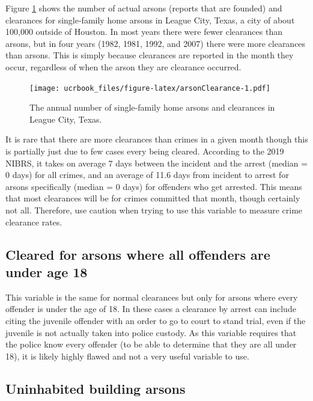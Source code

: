 \documentclass[
  12pt,
  openany]{book}
\begin{document}
Figure \ref{fig:arsonClearance} shows the number of actual arsons (reports that are founded) and clearances for single-family home arsons in League City, Texas, a city of about 100,000 outside of Houston. In most years there were fewer clearances than arsons, but in four years (1982, 1981, 1992, and 2007) there were more clearances than arsons. This is simply because clearances are reported in the month they occur, regardless of when the arson they are clearance occurred.

\begin{figure}
\centering
\texttt{[image: ucrbook\_files/figure-latex/arsonClearance-1.pdf]}
\caption{\label{fig:arsonClearance}The annual number of single-family home arsons and clearances in League City, Texas.}
\end{figure}

It is rare that there are more clearances than crimes in a given month though this is partially just due to few cases every being cleared. According to the 2019 NIBRS, it takes on average 7 days between the incident and the arrest (median = 0 days) for all crimes, and an average of 11.6 days from incident to arrest for arsons specifically (median = 0 days) for offenders who get arrested. This means that most clearances will be for crimes committed that month, though certainly not all. Therefore, use caution when trying to use this variable to measure crime clearance rates.

\hypertarget{cleared-for-arsons-where-all-offenders-are-under-age-18}{%
\subsection{Cleared for arsons where all offenders are under age 18}\label{cleared-for-arsons-where-all-offenders-are-under-age-18}}

This variable is the same for normal clearances but only for arsons where every offender is under the age of 18. In these cases a clearance by arrest can include citing the juvenile offender with an order to go to court to stand trial, even if the juvenile is not actually taken into police custody. As this variable requires that the police know every offender (to be able to determine that they are all under 18), it is likely highly flawed and not a very useful variable to use.

\hypertarget{uninhabited-building-arsons}{%
\subsection{Uninhabited building arsons}\label{uninhabited-building-arsons}}
\end{document}
